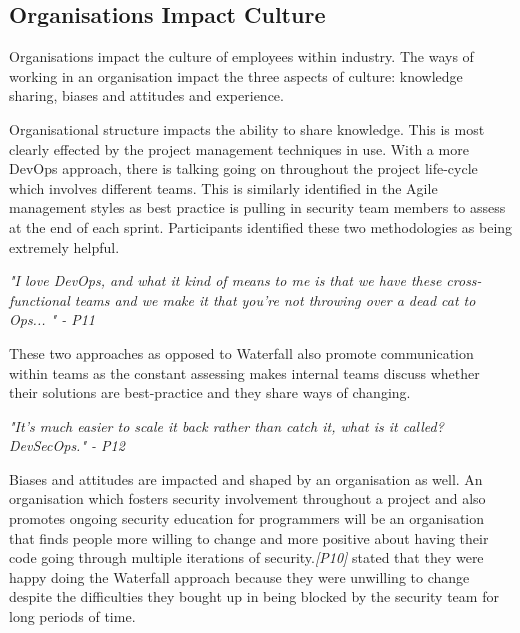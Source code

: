\subsection{Organisations Impact Culture}

\par Organisations impact the culture of employees within industry. The ways of working in an organisation impact the three aspects of culture: knowledge sharing, biases and attitudes and experience.
\newline
\par
Organisational structure impacts the ability to share knowledge. This is most clearly effected by the project management techniques in use. With a more DevOps approach, there is talking going on throughout the project life-cycle which involves different teams. This is similarly identified in the Agile management styles as best practice is pulling in security team members to assess at the end of each sprint. Participants identified these two methodologies as being extremely helpful. 
\newline
\par
\textit{"I love DevOps, and what it kind of means to me is that we have these cross-functional teams and we make it that you're not throwing over a dead cat to Ops... " - P11}
\newline
\par
These two approaches as opposed to Waterfall also promote communication within teams as the constant assessing makes internal teams discuss whether their solutions are best-practice and they share ways of changing. 
\newline
\par 
\textit{"It's much easier to scale it back rather than catch it, what is it called? DevSecOps." - P12}
\newline
\par
Biases and attitudes are impacted and shaped by an organisation as well. An organisation which fosters security involvement throughout a project and also promotes ongoing security education for programmers will be an organisation that finds people more willing to change and more positive about having their code going through multiple iterations of security.\textit{[P10]} stated that they were happy doing the Waterfall approach because they were unwilling to change despite the difficulties they bought up in being blocked by the security team for long periods of time. 
\newline
\par
